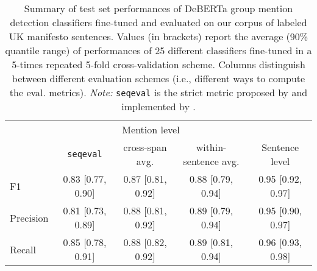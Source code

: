 \begin{table}[!th]

\caption{\label{tab:uk-manifestos_5x5-crossval_deberta-finetuning_testset_sg}Summary of test set performances of DeBERTa group mention detection classifiers fine-tuned and evaluated on our corpus of labeled UK manifesto sentences. Values (in brackets) report the average (90\% quantile range) of performances of 25 different classifiers fine-tuned in a 5-times repeated 5-fold cross-validation scheme. Columns distinguish between different evaluation schemes (i.e., different ways to compute the eval. metrics). \emph{Note:} \texttt{seqeval} is the strict metric proposed by \citet{ramshaw_text_1995} and implemented by \citet{nakayama_seqeval_2018}.}
\centering
\fontsize{10}{12}\selectfont
\begin{tabular}[t]{lcccc}
\toprule
\multicolumn{1}{c}{ } & \multicolumn{3}{c}{Mention level} & \multicolumn{1}{c}{ } \\
\cmidrule(l{3pt}r{3pt}){2-4}
  & \texttt{seqeval} & cross-span avg. & within-sentence avg. & Sentence level\\
\midrule
F1 & 0.83 [0.77, 0.90] & 0.87 [0.81, 0.92] & 0.88 [0.79, 0.94] & 0.95 [0.92, 0.97]\\
Precision & 0.81 [0.73, 0.89] & 0.88 [0.81, 0.92] & 0.89 [0.79, 0.94] & 0.95 [0.90, 0.97]\\
Recall & 0.85 [0.78, 0.91] & 0.88 [0.82, 0.92] & 0.89 [0.81, 0.94] & 0.96 [0.93, 0.98]\\
\bottomrule
\end{tabular}
\end{table}
